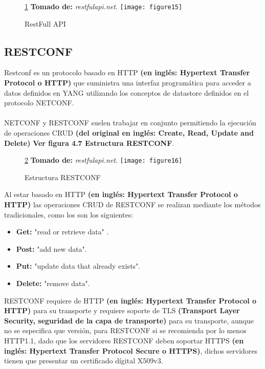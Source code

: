 \begin{figure}[htbp]
 \ref{fig:restfulapi} \textbf{Tomado de:} \textit{restfulapi.net}.
  \centering
    {\texttt{[image: figure15]}}%
  \caption{\footnotesize{RestFull API}}
  \label{fig:restfulapi}
\end{figure}

\subsection{RESTCONF}

Restconf es un protocolo basado en HTTP \textbf{(en inglés: Hypertext Transfer Protocol o HTTP)} que suministra una interfaz programática para acceder a datos definidos en YANG utilizando los conceptos de datastore definidos en el protocolo NETCONF.
\\
\\
NETCONF y RESTCONF suelen trabajar en conjunto permitiendo la ejecución de operaciones CRUD \textbf{(del original en inglés: Create, Read, Update and Delete)} \textbf{Ver figura 4.7 Estructura RESTCONF}.
\begin{figure}[htbp]
\ref{fig:restfulapi2} \textbf{Tomado de:} \textit{restfulapi.net}.
  \centering
    {\texttt{[image: figure16]}}%
  \caption{\footnotesize{Estructura RESTCONF}}
  \label{fig:restfulapi2}
\end{figure}
Al estar basado en HTTP  \textbf{(en inglés: Hypertext Transfer Protocol o HTTP)} las operaciones CRUD de RESTCONF se realizan mediante los métodos tradicionales, como los son los siguientes:
\begin{itemize}
\item\textbf{Get:} "read or retrieve data"	.
\item\textbf{Post:} "add new data".
\item\textbf{Put:} "update data that already exists".
\item\textbf{Delete:} "remove data".
\end{itemize}

RESTCONF requiere de HTTP \textbf{(en inglés: Hypertext Transfer Protocol o HTTP)} para su transporte y requiere soporte de TLS \textbf{(Transport Layer Security, seguridad de la capa de transporte)} para su transporte, aunque no se especifica que versión, para RESTCONF si se recomienda por lo menos HTTP1.1, dado que los servidores RESTCONF deben soportar HTTPS \textbf{(en inglés: Hypertext Transfer Protocol Secure o HTTPS)}, dichos servidores tienen que presentar un certificado dígital X509v3.

